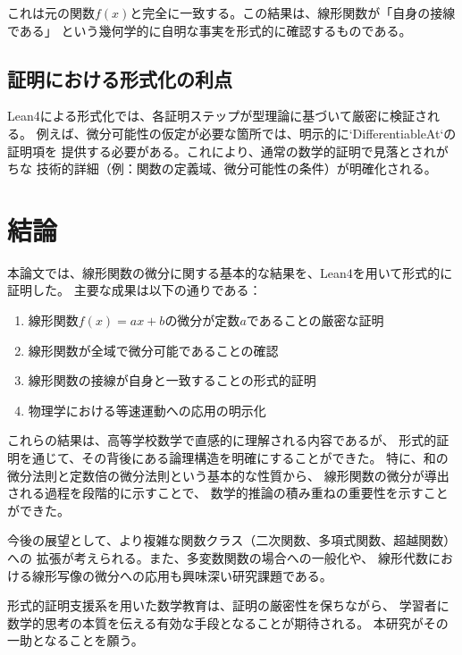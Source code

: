 \documentclass[a4paper,11pt]{jlreq}
\begin{document}
これは元の関数$f(x)$と完全に一致する。この結果は、線形関数が「自身の接線である」
という幾何学的に自明な事実を形式的に確認するものである。

\subsection{証明における形式化の利点}

Lean4による形式化では、各証明ステップが型理論に基づいて厳密に検証される。
例えば、微分可能性の仮定が必要な箇所では、明示的に`DifferentiableAt`の証明項を
提供する必要がある。これにより、通常の数学的証明で見落とされがちな
技術的詳細（例：関数の定義域、微分可能性の条件）が明確化される。

\section{結論}

本論文では、線形関数の微分に関する基本的な結果を、Lean4を用いて形式的に証明した。
主要な成果は以下の通りである：

\begin{enumerate}
\item 線形関数$f(x) = ax + b$の微分が定数$a$であることの厳密な証明
\item 線形関数が全域で微分可能であることの確認
\item 線形関数の接線が自身と一致することの形式的証明
\item 物理学における等速運動への応用の明示化
\end{enumerate}

これらの結果は、高等学校数学で直感的に理解される内容であるが、
形式的証明を通じて、その背後にある論理構造を明確にすることができた。
特に、和の微分法則と定数倍の微分法則という基本的な性質から、
線形関数の微分が導出される過程を段階的に示すことで、
数学的推論の積み重ねの重要性を示すことができた。

今後の展望として、より複雑な関数クラス（二次関数、多項式関数、超越関数）への
拡張が考えられる。また、多変数関数の場合への一般化や、
線形代数における線形写像の微分への応用も興味深い研究課題である。

形式的証明支援系を用いた数学教育は、証明の厳密性を保ちながら、
学習者に数学的思考の本質を伝える有効な手段となることが期待される。
本研究がその一助となることを願う。

\end{document}
